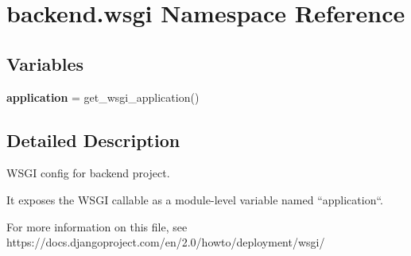 \hypertarget{namespacebackend_1_1wsgi}{}\section{backend.\+wsgi Namespace Reference}
\label{namespacebackend_1_1wsgi}
\subsection*{Variables}
\begin{DoxyCompactItemize}
\item 
\mbox{\label{namespacebackend_1_1wsgi_ab3a19d2f6ea1e51cbac1551dd07299fd}} 
{\bfseries application} = get\+\_\+wsgi\+\_\+application()
\end{DoxyCompactItemize}


\subsection{Detailed Description}
\begin{DoxyVerb}WSGI config for backend project.

It exposes the WSGI callable as a module-level variable named ``application``.

For more information on this file, see
https://docs.djangoproject.com/en/2.0/howto/deployment/wsgi/
\end{DoxyVerb}
 